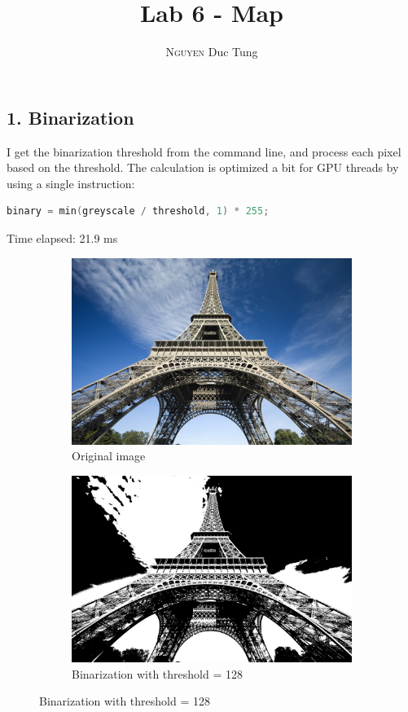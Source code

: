 \documentclass[12pt]{article}
\title{Lab 6 - Map}
\author{\textsc{Nguyen} Duc Tung}
\date{}
\begin{document}
\maketitle

\subsection*{1. Binarization}

I get the binarization threshold from the command line, and process each pixel based on the threshold. The calculation is optimized a bit for GPU threads by using a single instruction:

\begin{lstlisting}[language=C]
binary = min(greyscale / threshold, 1) * 255;
\end{lstlisting}

Time elapsed: 21.9 ms

\begin{figure}[H]
  \centering
  \begin{subfigure}{.45\textwidth}
    \includegraphics[width=\linewidth]{./img/origin.jpg}
    \caption{Original image}
  \end{subfigure}
  \hspace{1cm}
  \begin{subfigure}{.45\textwidth}
    \includegraphics[width=\linewidth]{./img/6a.jpg}
    \caption{Binarization with threshold = 128}
  \end{subfigure}
\end{figure}
\end{document}
